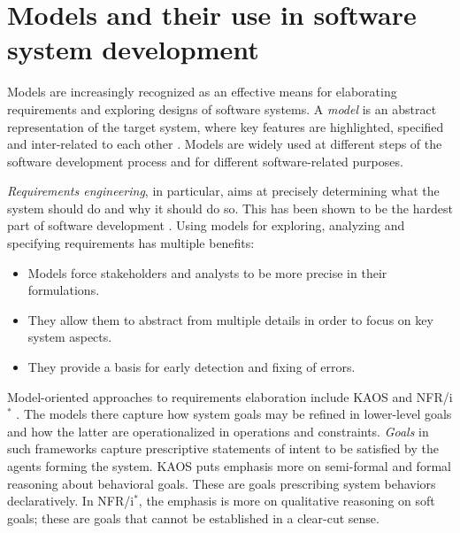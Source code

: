 \section{Models and their use in software system development\label{section:intro-models}}

Models are increasingly recognized as an effective means for elaborating requirements and exploring designs of software systems. A \emph{model} is an abstract representation of the target system, where key features are highlighted, specified and inter-related to each other \cite{VanLamsweerde:2009}. Models are widely used at different steps of the software development process and for different software-related purposes.


\emph{Requirements engineering}, in particular, aims at precisely determining what the system should do and why it should do so. This has been shown to be the hardest part of software development \cite{Brooks:1987}. Using models for exploring, analyzing and specifying requirements has multiple benefits:
\begin{itemize}
\item Models force stakeholders and analysts to be more precise in their formulations.
\item They allow them to abstract from multiple details in order to focus on key system aspects.
\item They provide a basis for early detection and fixing of errors.
\end{itemize}
Model-oriented approaches to requirements elaboration include KAOS \cite{VanLamsweerde:2009} and NFR/i$^*$ \cite{Mylopoulos:1992, Yu:1993}. The models there capture how system goals may be refined in lower-level goals and how the latter are operationalized in operations and constraints. \emph{Goals} in such frameworks capture prescriptive statements of intent to be satisfied by the agents forming the system. KAOS puts emphasis more on semi-formal and formal reasoning about behavioral goals. These are goals prescribing system behaviors declaratively. In NFR/i$^*$, the emphasis is more on qualitative reasoning on soft goals; these are goals that cannot be established in a clear-cut sense.


